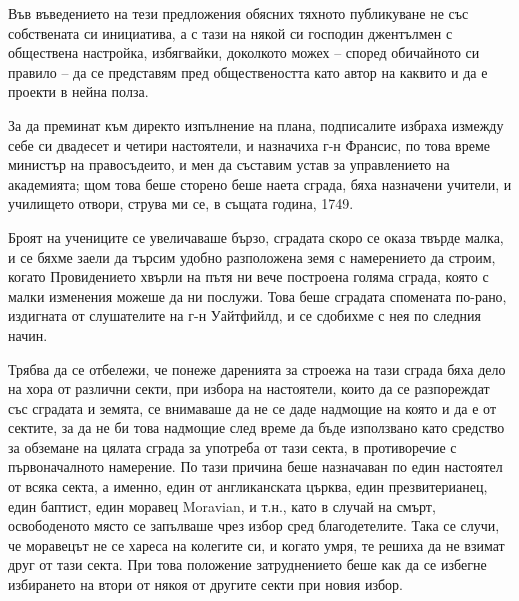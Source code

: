 \documentclass[12pt]{book}
\begin{document}
Във въведението на тези предложения обясних тяхното публикуване не със собствената си инициатива, а с тази на някой си господин джентълмен с обществена настройка, избягвайки, доколкото можех – според обичайното си правило – да се представям пред обществеността като автор на каквито и да е проекти в нейна полза. 

За да преминат към директо изпълнение на плана, подписалите избраха измежду себе си двадесет и четири настоятели, и назначиха г-н Франсис, по това време министър на правосъдеито, и мен да съставим устав за управлението на академията; щом това беше сторено беше наета сграда, бяха назначени учители, и училището отвори, струва ми се, в същата година, 1749.

Броят на учениците се увеличаваше бързо, сградата скоро се оказа твърде малка, и се бяхме заели да търсим удобно разположена земя с намерението да строим, когато Провидението хвърли на пътя ни вече построена голяма сграда, която с малки изменения можеше да ни послужи. Това беше сградата спомената по-рано, издигната от слушателите на г-н Уайтфийлд, и се сдобихме с нея по следния начин.

Трябва да се отбележи, че понеже даренията за строежа на тази сграда бяха дело на хора от различни секти, при избора на настоятели, които да се разпореждат със сградата и земята, се внимаваше да не се даде надмощие на която и да е от сектите, за да не би това надмощие след време да бъде използвано като средство за обземане на цялата сграда за употреба от тази секта, в противоречие с първоначалното намерение. По тази причина беше назначаван по един настоятел от всяка секта, а именно, един от англиканската църква, един презвитерианец, един баптист, един моравец Moravian, и т.н., като в случай на смърт, освободеното място се запълваше чрез избор сред благодетелите. Така се случи, че моравецът не се хареса на колегите си, и когато умря, те решиха да не взимат друг от тази секта. При това положение затруднението беше как да се избегне избирането на втори от някоя от другите секти при новия избор. 
\end{document}
